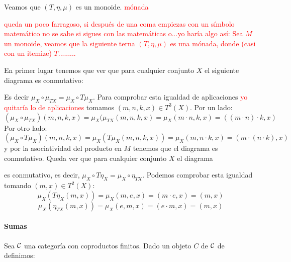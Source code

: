 Veamos que $(T, \eta, \mu)$ es un monoide. \textcolor{red}{mónada}


\textcolor{red}{queda un poco farragoso, si después de una coma empiezas con un símbolo matemático no se sabe si sigues con las matemáticas o...yo haría algo así: Sea $M$ un monoide, veamos que la siguiente terna $(T, \eta, \mu)$ es una mónada, donde (casi con un itemize) $T$.........}

En primer lugar
tenemos que ver que para cualquier conjunto $X$ el siguiente
diagrama es conmutativo:

\begin{center}
\end{center}
Es decir $\mu_X \circ \mu_{TX} = \mu_X \circ T\mu_X$. Para comprobar
esta igualdad de aplicaciones \textcolor{red}{yo quitaría lo de aplicaciones} tomamos $(m, n, k, x) \in T^3(X)$.
Por un lado:
$$(\mu_X \circ \mu_{TX})(m, n, k, x) = \mu_X(\mu_{TX}(m, n, k, x)
  = \mu_X(m\cdot n, k, x) = ((m\cdot n)\cdot k, x)$$
Por otro lado:
$$(\mu_X \circ T\mu_X)(m, n, k, x) = \mu_X(T\mu_X(m, n, k, x))
  = \mu_X(m, n\cdot k, x) = (m \cdot (n\cdot k), x)$$
y por la asociatividad del producto en $M$ tenemos que
el diagrama es conmutativo.
Queda ver que para cualquier conjunto $X$ el diagrama
\begin{center}
\end{center}
es conmutativo, es decir, $\mu_X \circ T\eta_X = \mu_X \circ \eta_{TX}$. Podemos
comprobar esta igualdad tomando $(m, x) \in T^2(X)$:
$$\mu_X(T\eta_X(m, x)) = \mu_X(m, e, x) = (m \cdot e, x) = (m, x)$$
$$\mu_X(\eta_{TX}(m, x)) = \mu_X(e, m, x) = (e\cdot m, x) = (m, x)$$

\paragraph{Sumas}
Sea $\mathcal{C}$ una categoría con coproductos finitos. Dado un objeto
$C$ de $\mathcal{C}$ de definimos:

